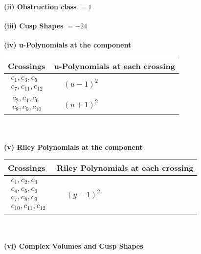 \documentclass[1p]{elsarticle_modified}
\theoremstyle{definition}
\begin{document}
\flushleft \textbf{(ii) Obstruction class $= 1$}\\~\\
\flushleft \textbf{(iii) Cusp Shapes $= -24$}\\~\\
\newpage\renewcommand{\arraystretch}{1}
\flushleft \textbf{(iv) u-Polynomials at the component}\newline \\
\begin{tabular}{m{50pt}|m{274pt}}
Crossings & \hspace{64pt}u-Polynomials at each crossing \\
\hline $$\begin{aligned}c_{1},c_{3},c_{5}\\c_{7},c_{11},c_{12}\end{aligned}$$&$\begin{aligned}
&(u-1)^2
\end{aligned}$\\
\hline $$\begin{aligned}c_{2},c_{4},c_{6}\\c_{8},c_{9},c_{10}\end{aligned}$$&$\begin{aligned}
&(u+1)^2
\end{aligned}$\\
\hline
\end{tabular}\\~\\
\newpage\renewcommand{\arraystretch}{1}
\flushleft \textbf{(v) Riley Polynomials at the component}\newline \\
\begin{tabular}{m{50pt}|m{274pt}}
Crossings & \hspace{64pt}Riley Polynomials at each crossing \\
\hline $$\begin{aligned}c_{1},c_{2},c_{3}\\c_{4},c_{5},c_{6}\\c_{7},c_{8},c_{9}\\c_{10},c_{11},c_{12}\end{aligned}$$&$\begin{aligned}
&(y-1)^2
\end{aligned}$\\
\hline
\end{tabular}\\~\\
\newpage\flushleft \textbf{(vi) Complex Volumes and Cusp Shapes}
\end{document}
